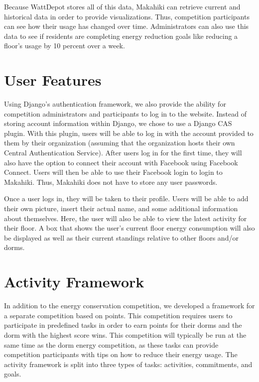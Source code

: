 Because WattDepot stores all of this data, Makahiki can retrieve current and historical data in order to provide visualizations.  Thus, competition participants can see how their usage has changed over time.  Administrators can also use this data to see if residents are completing energy reduction goals like reducing a floor's usage by 10 percent over a week.

\section{User Features}
\label{user}

Using Django's authentication framework, we also provide the ability for competition administrators and participants to log in to the website.  Instead of storing account information within Django, we chose to use a Django CAS plugin\cite{django-cas}.  With this plugin, users will be able to log in with the account provided to them by their organization (assuming that the organization hosts their own Central Authentication Service).  After users log in for the first time, they will also have the option to connect their account with Facebook using Facebook Connect.  Users will then be able to use their Facebook login to login to Makahiki.  Thus, Makahiki does not have to store any user passwords.

Once a user logs in, they will be taken to their profile.  Users will be able to add their own picture, insert their actual name, and some additional information about themselves.  Here, the user will also be able to view the latest activity for their floor.  A box that shows the user's current floor energy consumption will also be displayed as well as their current standings relative to other floors and/or dorms.

\section{Activity Framework}
\label{activity}

In addition to the energy conservation competition, we developed a framework for a separate competition based on points.  This competition requires users to participate in predefined tasks in order to earn points for their dorms and the dorm with the highest score wins.  This competition will typically be run at the same time as the dorm energy competition, as these tasks can provide competition participants with tips on how to reduce their energy usage.  The activity framework is split into three types of tasks: activities, commitments, and goals.

